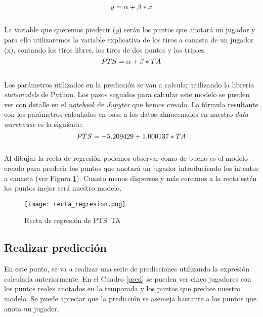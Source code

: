 \documentclass[11pt]{diazessay} %
\begin{document}
\begin{equation}
\centering
y = \alpha + \beta * x
\end{equation}
\\
La variable que queremos predecir (\textit{y}) serán los puntos que anotará un jugador y para ello utilizaremos la variable explicativa de los tiros a canasta de un jugador (x), contando los tiros libres, los tiros de dos puntos y los triples. \\

\begin{equation}
\centering
PTS = \alpha + \beta * TA
\end{equation}
\\
Los parámetros utilizados en la predicción se van a calcular utilizando la librería \textit{statsmodels} \cite{statsmodels} de Python. Los pasos seguidos para calcular este modelo se pueden ver con detalle en el \textit{notebook} de \textit{Jupyter} \cite{jupyter} que hemos creado. La fórmula resultante con los parámetros calculados en base a los datos almacenados en nuestro \textit{data warehouse} es la siguiente:\\
\begin{equation}
\centering
PTS = -5.209429 + 1.000137 * TA
\end{equation}
\\
Al dibujar la recta de regresión \cite{recta} podemos observar como de bueno es el modelo creado para predecir los puntos que anotará un jugador introduciendo los intentos a canasta (ver Figura \ref{fig:recta}). Cuanto menos dispersos y más cercanos a la recta estén los puntos mejor será nuestro modelo.

\begin{figure}[!h]
	\centering
	\texttt{[image: recta\_regresion.png]}
	\caption{Recta de regresión de PTS~TA}
	\label{fig:recta}
\end{figure}

\subsection*{Realizar predicción}
En este punto, se va a realizar una serie de predicciones utilizando la expresión calculada anteriormente. En el Cuadro \ref{pred} se pueden ver cinco jugadores con los puntos reales anotados en la temporada y los puntos que predice nuestro modelo. Se puede apreciar que la predicción se asemeja bastante a los puntos que anota un jugador. \\
\end{document}
